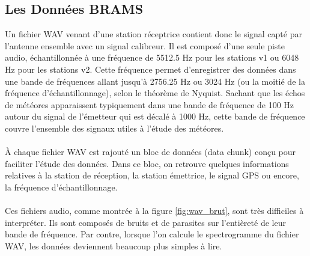 \documentclass[11pt]{article}
\begin{document}


\subsection{Les Données BRAMS}


Un fichier WAV venant d'une station réceptrice contient donc le signal capté par l'antenne ensemble avec un signal calibreur.
Il est composé d'une seule piste audio, échantillonnée à une fréquence de 5512.5 Hz pour les stations v1 ou 6048 Hz pour les stations v2.
Cette fréquence permet d'enregistrer des données dans une bande de fréquences allant jusqu'à 2756.25 Hz ou 3024 Hz (ou la moitié de la fréquence d'échantillonnage), selon le théorème de Nyquist.
Sachant que les échos de météores apparaissent typiquement dans une bande de fréquence de 100 Hz autour du signal de l'émetteur qui est décalé à 1000 Hz, cette bande de fréquence couvre l'ensemble des signaux utiles à l'étude des météores.\\
\\
À chaque fichier WAV est rajouté un bloc de données (data chunk) conçu pour faciliter l'étude des données.
Dans ce bloc, on retrouve quelques informations relatives à la station de réception, la station émettrice, le signal GPS ou encore, la fréquence d'échantillonnage.\\
\\
Ces fichiers audio, comme montrée à la figure \ref{fig:wav_brut}, sont très difficiles à interpréter.
Ils sont composés de bruits et de parasites sur l'entièreté de leur bande de fréquence.
Par contre, lorsque l'on calcule le spectrogramme du fichier WAV, les données deviennent beaucoup plus simples à lire.
\end{document}
